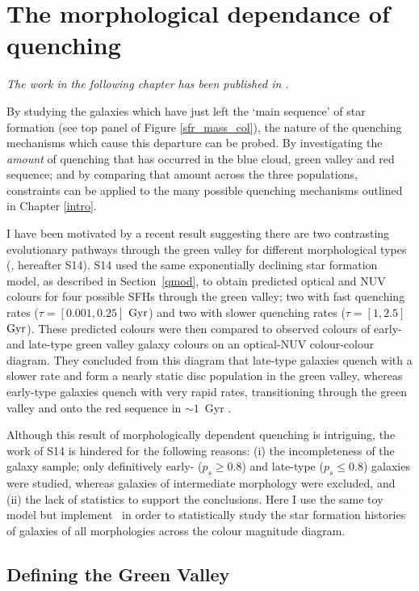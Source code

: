 \chapter{The morphological dependance of quenching}\label{morph}

\emph{The work in the following chapter has been published in \citet{smethurst15}.}


By studying the galaxies which have just left the `main sequence' of star formation (see top panel of Figure \ref{sfr_mass_col}), the nature of the quenching mechanisms which cause this departure can be probed. By investigating the \emph{amount} of quenching that has occurred in the blue cloud, green valley and red sequence; and by comparing that amount across the three populations, constraints can be applied to the many possible quenching mechanisms outlined in Chapter \ref{intro}. 

I have been motivated by a recent result suggesting there are two contrasting evolutionary pathways through the green valley for different morphological types (\citealt{schawinski14}, hereafter S14). S14 used the same exponentially declining star formation model, as described in Section~\ref{qmod}, to obtain predicted optical and NUV colours for four possible SFHs through the green valley; two with fast quenching rates ($\tau = [0.001, 0.25]$ $\rm{Gyr}$) and two with slower quenching rates ($\tau = [1, 2.5]$ $\rm{Gyr}$). These predicted colours were then compared to observed colours of early- and late-type green valley galaxy colours on an optical-NUV colour-colour diagram. They concluded from this diagram that late-type galaxies quench with a slower rate and form a nearly static disc population in the green valley, whereas early-type galaxies quench with very rapid rates, transitioning through the green valley and onto the red sequence in $\sim 1$~Gyr \citep{Wong12}. 

Although this result of morphologically dependent quenching is intriguing, the work of S14 is hindered for the following reasons: (i) the incompleteness of the galaxy sample; only definitively early- ($p_s \geq 0.8$) and late-type ($p_s \leq 0.8$) galaxies were studied, whereas galaxies of intermediate morphology were excluded, and (ii) the lack of statistics to support the conclusions. Here I use the same toy model but implement \starpy ~in order to statistically study the star formation histories of galaxies of all morphologies across the colour magnitude diagram.


\section{Defining the Green Valley}\label{defGV}

